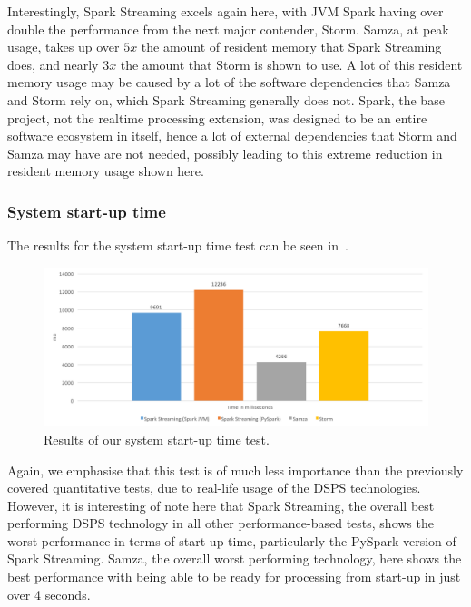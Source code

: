 Interestingly, Spark Streaming excels again here, with JVM Spark having over double the performance from the next major
contender, Storm. Samza, at peak usage, takes up over $5x$ the amount of resident memory that Spark Streaming does, and
nearly $3x$ the amount that Storm is shown to use. A lot of this resident memory usage may be caused by a lot of the
software dependencies that Samza and Storm rely on, which Spark Streaming generally does not. Spark, the base project,
not the realtime processing extension, was designed to be an entire software ecosystem in itself, hence a lot of external
dependencies that Storm and Samza may have are not needed, possibly leading to this extreme reduction in resident memory
usage shown here.

\subsubsection{System start-up time}

The results for the system start-up time test can be seen in~.

\begin{figure}[H]
  \centering
  \includegraphics[width=1\textwidth]{includes/figures/fig_startup_time_res}
  \caption{Results of our system start-up time test.}
  \label{fig:startup_time}
\end{figure}

Again, we emphasise that this test is of much less importance than the previously covered quantitative tests, due to real-life usage
of the DSPS technologies. However, it is interesting of note here that Spark Streaming, the overall best performing
DSPS technology in all other performance-based tests, shows the worst performance in-terms of start-up time, particularly
the PySpark version of Spark Streaming. Samza, the overall worst performing technology, here shows the best performance
with being able to be ready for processing from start-up in just over 4 seconds.

